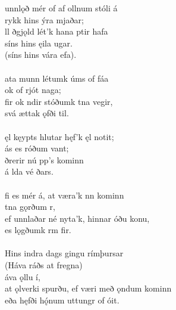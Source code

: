 \bva {}unnlǫð mér of af \hld {}ollnum stóli á \\%
\ind {}rykk hins ýra mjaðar; \\%
ll ðgjǫld \hld lét'k hana ptir hafa \\%
\ind síns hins ęila ugar. \\%
\ind (síns hins vára efa).\\%

 \\

\bva {}ata munn \hld létumk úms of fáa \\%
\ind ok of rjót naga; \\%
fir ok ndir \hld stóðumk tna vegir, \\%
\ind svá ættak ǫfði til.\\%

 \\

\bva {}ęl kęypts hlutar \hld hęf'k ęl notit; \\%
\ind {}ás es róðum vant; \\%
ðrerir \hld nú pp's kominn \\%
\ind á lda vé ðars.\\%

 \\

\bva {}fi es mér á, \hld at væra'k nn kominn \\%
\ind {}tna gǫrðum r, \\%
ef unnlaðar né nyta'k, \hld hinnar óðu konu, \\%
\ind es lǫgðumk rm fir.\\%

 \\

\bva Hins indra dags \hld gingu rímþursar \\%
\ind (Háva ráðs at fregna) \\%
\ind {}áva ǫllu í, \\%
at ǫlverki spurðu, \hld ef væri með ǫndum kominn \\%
\ind eða hęfði hǫ́num uttungr of óit.\\%

